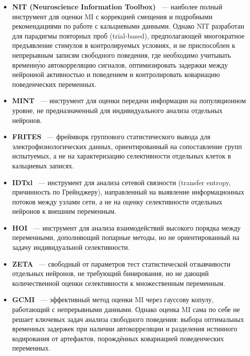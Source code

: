 \begin{itemize}
    \item \textbf{NIT (Neuroscience Information Toolbox)}~\cite{Maffulli2022} --- наиболее полный инструмент для оценки MI с коррекцией смещения и подробными рекомендациями по работе с кальциевыми данными. Однако NIT разработан для парадигмы повторных проб (trial-based), предполагающей многократное предъявление стимулов в контролируемых условиях, и не приспособлен к непрерывным записям свободного поведения, где необходимо учитывать временн\'{у}ю автокорреляцию сигналов, оптимизировать задержки между нейронной активностью и поведением и контролировать ковариацию поведенческих переменных.

    \item \textbf{MINT}~\cite{Lorenz2025} --- инструмент для оценки передачи информации на популяционном уровне, не предназначенный для индивидуального анализа отдельных нейронов.

    \item \textbf{FRITES}~\cite{Combrisson2022} --- фреймворк группового статистического вывода для электрофизиологических данных, ориентированный на сопоставление групп испытуемых, а не на характеризацию селективности отдельных клеток в кальциевых записях.

    \item \textbf{IDTxl}~\cite{IDTxl2019} --- инструмент для анализа сетевой связности (transfer entropy, причинность по Грейнджеру), направленный на выявление информационных потоков между узлами сети, а не на оценку селективности отдельных нейронов к внешним переменным.

    \item \textbf{HOI}~\cite{Neri2024} --- инструмент для анализа взаимодействий высокого порядка между переменными, дополняющий попарные методы, но не ориентированный на задачу индивидуальной селективности.

    \item \textbf{ZETA}~\cite{Montijn2021zeta} --- свободный от параметров тест статистической отзывчивости отдельных нейронов, не требующий бинирования, но не дающий количественной оценки селективности к множественным переменным.

    \item \textbf{GCMI}~\cite{Ince2017} --- эффективный метод оценки MI через гауссову копулу, работающий с непрерывными данными. Однако оценка MI сама по себе не решает ключевых задач анализа свободного поведения: выбора оптимальных временных задержек при наличии автокорреляции и разделения истинного кодирования от артефактов, порождённых ковариацией поведенческих переменных.
\end{itemize}

